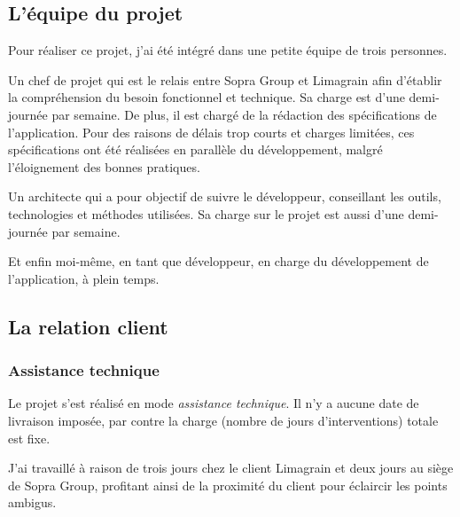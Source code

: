 \subsection{L'équipe du projet}

Pour réaliser ce projet, j'ai été intégré dans une petite équipe de trois personnes.

Un chef de projet qui est le relais entre Sopra Group et Limagrain afin d'établir la compréhension du besoin fonctionnel et technique.
Sa charge est d'une demi-journée par semaine.
De plus, il est chargé de la rédaction des spécifications de l'application.
Pour des raisons de délais trop courts et charges limitées, ces spécifications ont été réalisées en parallèle du développement, malgré l'éloignement des bonnes pratiques.

Un architecte qui a pour objectif de suivre le développeur, conseillant les outils, technologies et méthodes utilisées.
Sa charge sur le projet est aussi d'une demi-journée par semaine.

Et enfin moi-même, en tant que développeur, en charge du développement de l'application, à plein temps.


\subsection{La relation client}


\subsubsection{Assistance technique}


Le projet s'est réalisé en mode \textit{assistance technique}.
Il n'y a aucune date de livraison imposée, par contre la charge (nombre de jours d'interventions) totale est fixe.

J'ai travaillé à raison de trois jours chez le client Limagrain et deux jours au siège de Sopra Group, profitant ainsi de la proximité du client pour éclaircir les points ambigus.


